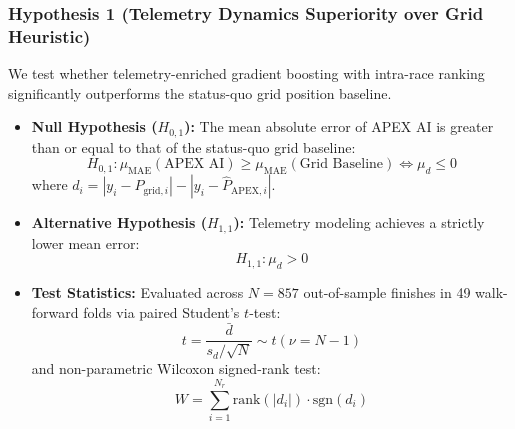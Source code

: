 \documentclass[journal]{IEEEtran}
\begin{document}
\subsubsection{Hypothesis 1 (Telemetry Dynamics Superiority over Grid Heuristic)}
We test whether telemetry-enriched gradient boosting with intra-race ranking significantly outperforms the status-quo grid position baseline.
\begin{itemize}
    \item \textbf{Null Hypothesis ($H_{0,1}$):} The mean absolute error of APEX AI is greater than or equal to that of the status-quo grid baseline:
    \begin{equation}
    H_{0,1}: \mu_{\text{MAE}}(\text{APEX AI}) \ge \mu_{\text{MAE}}(\text{Grid Baseline}) \iff \mu_d \le 0
    \end{equation}
    where $d_i = |y_i - P_{\text{grid}, i}| - |y_i - \hat{P}_{\text{APEX}, i}|$.
    \item \textbf{Alternative Hypothesis ($H_{1,1}$):} Telemetry modeling achieves a strictly lower mean error:
    \begin{equation}
    H_{1,1}: \mu_d > 0
    \end{equation}
    \item \textbf{Test Statistics:} Evaluated across $N = 857$ out-of-sample finishes in 49 walk-forward folds via paired Student's $t$-test:
    \begin{equation}
    t = \frac{\bar{d}}{s_d / \sqrt{N}} \sim t(\nu = N - 1)
    \end{equation}
    and non-parametric Wilcoxon signed-rank test:
    \begin{equation}
    W = \sum_{i=1}^{N_r} \text{rank}(|d_i|) \cdot \text{sgn}(d_i)
    \end{equation}
\end{itemize}
\end{document}
